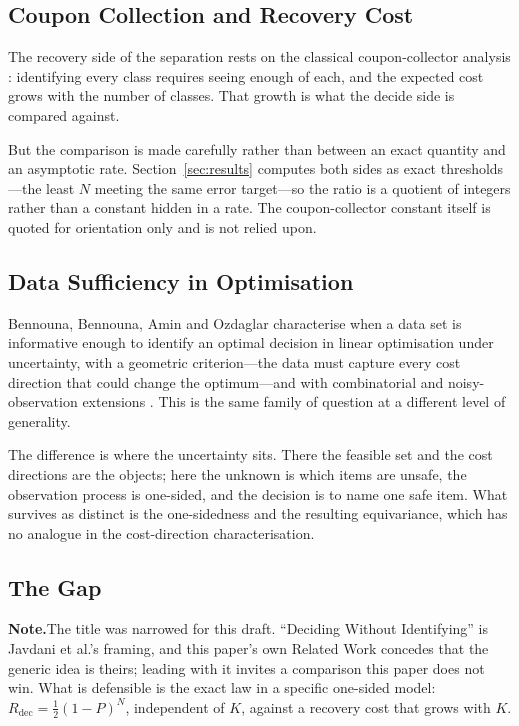 \documentclass[conference]{IEEEtran}
\theoremstyle{definition}
\newif\ifshownotes\shownotestrue
\newcommand{\NOTEPAR}[1]{\ifshownotes\par\vspace{2pt}\noindent%
  {\color{notecol}\textsf{\footnotesize\textbf{Note.}\;#1}}\par\vspace{2pt}\fi}
\begin{document}
\subsection{Coupon Collection and Recovery Cost}

The recovery side of the separation rests on the classical coupon-collector analysis
\cite{motwani1995}: identifying every class requires seeing enough of each, and the expected
cost grows with the number of classes. That growth is what the decide side is compared
against.

But the comparison is made carefully rather than between an exact quantity and an asymptotic
rate. Section~\ref{sec:results} computes both sides as exact thresholds---the least $N$
meeting the same error target---so the ratio is a quotient of integers rather than a constant
hidden in a rate. The coupon-collector constant itself is quoted for orientation only and is
not relied upon.

\subsection{Data Sufficiency in Optimisation}

Bennouna, Bennouna, Amin and Ozdaglar characterise when a data set is informative enough to
identify an optimal decision in linear optimisation under uncertainty, with a geometric
criterion---the data must capture every cost direction that could change the optimum---and
with combinatorial and noisy-observation extensions \cite{bennouna2026}. This is the same
family of question at a different level of generality.

The difference is where the uncertainty sits. There the feasible set and the cost directions
are the objects; here the unknown is which items are unsafe, the observation process is
one-sided, and the decision is to name one safe item. What survives as distinct is the
one-sidedness and the resulting equivariance, which has no analogue in the cost-direction
characterisation.

\subsection{The Gap}
\NOTEPAR{The title was narrowed for this draft. ``Deciding Without Identifying'' is
Javdani et al.'s framing, and this paper's own Related Work concedes that the generic idea is
theirs; leading with it invites a comparison this paper does not win. What is defensible is
the exact law in a specific one-sided model: $R_{\mathrm{dec}}=\tfrac12(1-P)^{N}$,
independent of $K$, against a recovery cost that grows with $K$.}
\end{document}

